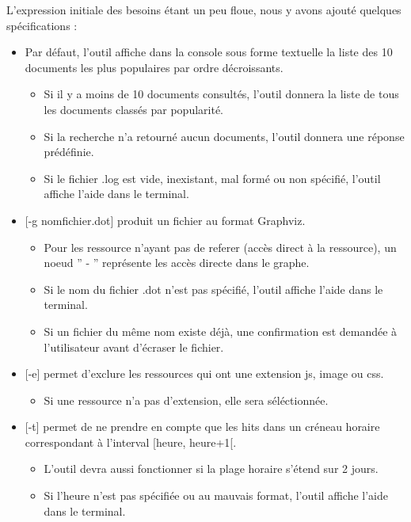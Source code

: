 \documentclass[a4paper]{article}
\begin{document}
	L'expression initiale des besoins étant un peu floue, nous y avons ajouté quelques spécifications :
	\begin{itemize}
		\item Par défaut, l'outil affiche dans la console sous forme textuelle la liste des 10 documents les plus populaires par ordre décroissants.
					\begin{itemize}
							\item Si il y a moins de 10 documents consultés, l'outil donnera la liste de tous les documents classés par popularité.
							\item Si la recherche n'a retourné aucun documents, l'outil donnera une réponse prédéfinie.
							\item Si le fichier .log est vide, inexistant, mal formé ou non spécifié, l'outil affiche l'aide dans le terminal.
					\end{itemize}
		\item{} [-g nomfichier.dot] produit un fichier au format Graphviz. 
					\begin{itemize}
							\item Pour les ressource n'ayant pas de referer (accès direct à la ressource), un noeud '' - '' représente les accès directe dans le graphe.
							\item Si le nom du fichier .dot n'est pas spécifié, l'outil affiche l'aide dans le terminal.
							\item Si un fichier du même nom existe déjà, une confirmation est demandée à l'utilisateur avant d'écraser le fichier.
					\end{itemize}
		\item{} [-e] permet d'exclure les ressources qui ont une extension js, image ou css.
					\begin{itemize}
							\item Si une ressource n'a pas d'extension, elle sera séléctionnée.
					\end{itemize}
		\item{} [-t] permet de ne prendre en compte que les hits dans un créneau horaire correspondant à l'interval [heure, heure+1[.
					\begin{itemize}
							\item L'outil devra aussi fonctionner si la plage horaire s'étend sur 2 jours.
							\item Si l'heure n'est pas spécifiée ou au mauvais format, l'outil affiche l'aide dans le terminal.
					\end{itemize}
	\end{itemize}
							
\end{document}
